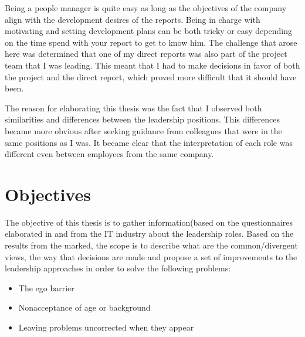 Being a people manager is quite easy as long as the objectives of the company align with the development desires of the reports. Being in charge with motivating and setting development plans can be both tricky or easy depending on the time spend with your report to get to know him. The challenge that arose here was determined that one of my direct reports was also part of the project team that I was leading. This meant that I had to make decisions in favor of both the project and the direct report, which proved more difficult that it should have been.

The reason for elaborating this thesis was the fact that I observed both similarities and differences between the leadership positions. This differences became more obvious after seeking guidance from colleagues that were in the same positions as I was. It became clear that the interpretation of each role was different even between employees from the same company.

\section{Objectives}
\label{sec:Objectives}
The objective of this thesis is to gather information(based on the questionnaires elaborated in \cite{abur-tl} and \cite{abur-pm}  from the IT industry about the leadership roles. Based on the results from the marked, the scope is to describe what are the common/divergent views, the way that decisions are made and propose a set of improvements to the leadership approaches in order to solve the following problems:

\begin{itemize}
\item The ego barrier
\item Nonacceptance of age or background
\item Leaving problems uncorrected when they appear
\end{itemize}